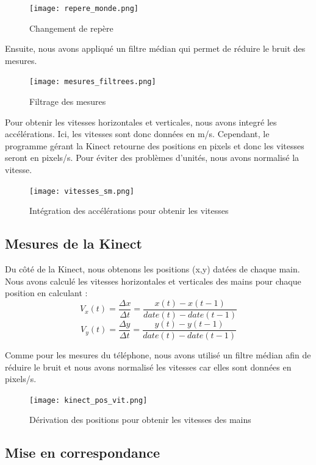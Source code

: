 \documentclass[12pt, french]{article}
\begin{document}
\begin{figure}[H]
\centering
\texttt{[image: repere\_monde.png]}
\caption{Changement de repère}
\label{fig6}
\end{figure}


Ensuite, nous avons appliqué un filtre médian qui permet de réduire le bruit des mesures.

\begin{figure}[H]
\centering
\texttt{[image: mesures\_filtrees.png]}
\caption{Filtrage des mesures}
\label{fig7}
\end{figure}

Pour obtenir les vitesses horizontales et verticales, nous avons integré  les accélérations. Ici, les vitesses sont donc données en m/s. Cependant, le programme gérant la Kinect retourne des positions en pixels et donc les vitesses seront en pixels/s. Pour éviter des problèmes d'unités, nous avons normalisé la vitesse.


\begin{figure}[h]
\centering
\texttt{[image: vitesses\_sm.png]}
\caption{Intégration des accélérations pour obtenir les vitesses}
\label{fig8}
\end{figure}

\subsection{Mesures de la Kinect}

Du côté de la Kinect, nous obtenons les positions (x,y) datées de chaque main. Nous avons calculé les vitesses horizontales et verticales des mains pour chaque position en calculant :
\[V_x(t) = \frac{\Delta x}{\Delta t}=\frac{x(t)-x(t-1)}{date(t)-date(t-1)}\] 
\[V_y(t) = \frac{\Delta y}{\Delta t}=\frac{y(t)-y(t-1)}{date(t)-date(t-1)}\]

Comme pour les mesures du téléphone, nous avons utilisé un filtre médian afin de réduire le bruit et nous avons normalisé les vitesses car elles sont données en pixels/s.


\begin{figure}[H]
\centering
\texttt{[image: kinect\_pos\_vit.png]}
\caption{Dérivation des positions pour obtenir les vitesses des mains}
\label{fig9}
\end{figure}

\subsection{Mise en correspondance}
\end{document}
